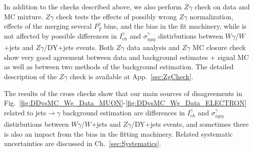 In addition to the checks described above, we also perform $Z\gamma$ check on data and MC mixture. $Z\gamma$ check tests the effects of possibly wrong $Z\gamma$ normalization, effects of the merging several $P_T^{\gamma}$ bins, and the bias in the fit machinery, while is not affected by possible differences in $I_{ch}^{\gamma}$ and $\sigma_{i\eta i\eta}^{\gamma}$ distirbutions between $W\gamma$/$W$+jets and $Z\gamma$/DY+jets events. Both $Z\gamma$ data analysis and $Z\gamma$ MC closure check show very good agreement between data and background estimates + signal MC as well as between two methods of the background estimation. The detailed description of the $Z\gamma$ check is available at App.~\ref{sec:ZgCheck}. 

The results of the cross checks show that our main sources of disagreements in Fig.~\ref{fig:DDvsMC_Wg_Data_MUON}-\ref{fig:DDvsMC_Wg_Data_ELECTRON} related to jets$\rightarrow\gamma$ background estimation are differences in $I_{ch}^{\gamma}$ and $\sigma_{i\eta i\eta}^{\gamma}$ distirbutions between $W\gamma$/$W$+jets and $Z\gamma$/DY+jets events, and sometimes there is also an impact from the bias in the fitting machinery. Related systematic uncertainties are discussed in Ch.~\ref{sec:Systematics}.

